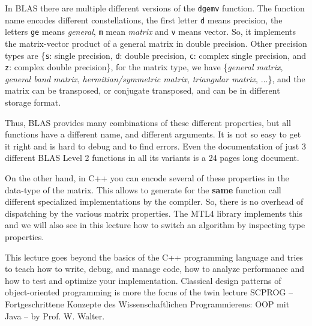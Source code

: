 \begin{rem}
  In BLAS there are multiple different versions of the \texttt{dgemv} function. The function name encodes different constellations, \ie
  the first letter \texttt{d} means  precision, the letters \texttt{ge} means \emph{general}, \texttt{m} mean \emph{matrix}
  and \texttt{v} means vector. So, it implements the matrix-vector product of a general matrix in double precision. Other precision
  types are \{\texttt{s}: single precision, \texttt{d}: double precision, \texttt{c}: complex single precision, and \texttt{z}: complex
  double precision\}, for the matrix type, we have \{\emph{general matrix}, \emph{general band matrix}, \emph{hermitian/symmetric matrix},
  \emph{triangular matrix}, $\ldots$\}, and the matrix can be transposed, or conjugate transposed, and can be in different storage format.

  Thus, BLAS provides many combinations of these different properties, but all functions have a different name, and different arguments. It
  is not so easy to get it right and is hard to debug and to find errors. Even the documentation of just 3 different BLAS Level 2 functions
  in all its variants is a 24 pages long document.

  On the other hand, in C++ you can encode several of these properties in the data-type of the matrix. This allows to generate for the \textbf{same}
  function call different specialized implementations by the compiler. So, there is no overhead of dispatching by the various matrix properties.
  The MTL4 library implements this and we will also see in this lecture how to switch an algorithm by inspecting type properties.
\end{rem}

This lecture goes beyond the basics of the C++ programming language and tries to teach how to write, debug, and manage code, how to analyze
performance and how to test and optimize your implementation. Classical design patterns of object-oriented programming is more the focus of
the twin lecture SCPROG -- Fortgeschrittene Konzepte des Wissenschaftlichen Programmierens: OOP mit Java -- by Prof. W. Walter.



